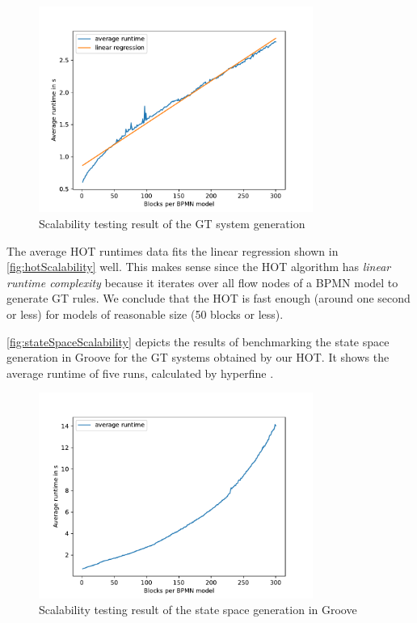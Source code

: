\documentclass{lmcs} %
\begin{document}
\begin{figure}[ht]
    \centering
    \includegraphics[width=0.8\textwidth]{images/HOT_scalability.pdf}
    \caption{Scalability testing result of the GT system generation}
    \label{fig:hotScalability}
\end{figure}

The average HOT runtimes data fits the linear regression shown in \autoref{fig:hotScalability} well.
This makes sense since the HOT algorithm has \textit{linear runtime complexity} because it iterates over all flow nodes of a BPMN model to generate GT rules.
We conclude that the HOT is fast enough (around one second or less) for models of reasonable size (50 blocks or less).

\autoref{fig:stateSpaceScalability} depicts the results of benchmarking the state space generation in Groove for the GT systems obtained by our HOT.
It shows the average runtime of five runs, calculated by hyperfine \cite{peterHyperfine2023}.

\begin{figure}[ht]
    \centering
    \includegraphics[width=0.8\textwidth]{images/StateSpaceGeneration_scalability.pdf}
    \caption{Scalability testing result of the state space generation in Groove}
    \label{fig:stateSpaceScalability}
\end{figure}
\end{document}
